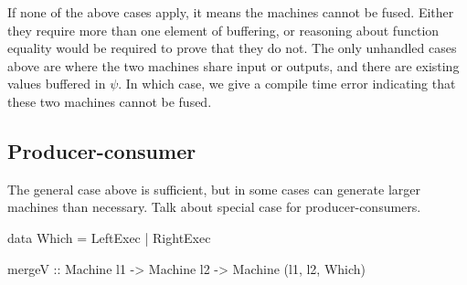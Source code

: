 If none of the above cases apply, it means the machines cannot be fused.
Either they require more than one element of buffering, or reasoning about function equality would be required to prove that they do not.
The only unhandled cases above are where the two machines share input or outputs, and there are existing values buffered in $\psi$.
In which case, we give a compile time error indicating that these two machines cannot be fused.




\subsection{Producer-consumer}
The general case above is sufficient, but in some cases can generate larger machines than necessary.
Talk about special case for producer-consumers.

\begin{code}
data Which = LeftExec | RightExec

mergeV :: Machine l1 -> Machine l2
       -> Machine (l1, l2, Which)
\end{code}

